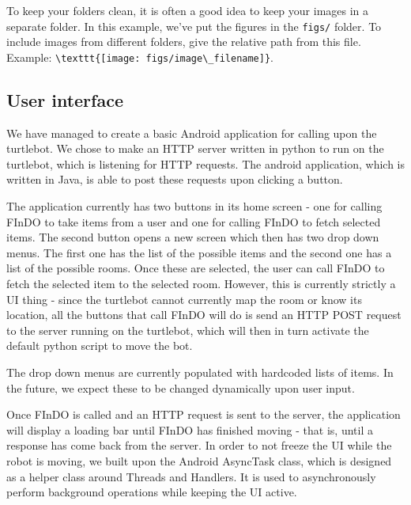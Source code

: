 \documentclass{article}
\begin{document}
To keep your folders clean, it is often a good idea to keep your images in a separate folder. In this example, we've put the figures in the \texttt{figs/} folder. To include images from different folders, give the relative path from this file. Example: \verb+\texttt{[image: figs/image\_filename]}+.


\subsection{User interface}

We have managed to create a basic Android application for calling upon the turtlebot. We chose to make an HTTP server written in python to run on the turtlebot, which is listening for HTTP requests. The android application, which is written in Java, is able to post these requests upon clicking a button.

The application currently has two buttons in its home screen - one for calling FInDO to take items from a user and one for calling FInDO to fetch selected items. The second button opens a new screen which then has two drop down menus. The first one has the list of the possible items and the second one has a list of the possible rooms. Once these are selected, the user can call FInDO to fetch the selected item to the selected room. However, this is currently strictly a UI thing - since the turtlebot cannot currently map the room or know its location, all the buttons that call FInDO will do is send an HTTP POST request to the server running on the turtlebot, which will then in turn activate the default python script to move the bot. 

The drop down menus are currently populated with hardcoded lists of items. In the future, we expect these to be changed dynamically upon user input.

Once FInDO is called and an HTTP request is sent to the server, the application will display a loading bar until FInDO has finished moving - that is, until a response has come back from the server. In order to not freeze the UI while the robot is moving, we built upon the Android AsyncTask class, which is designed as a helper class around Threads and Handlers. It is used to asynchronously perform background operations while keeping the UI active.
\end{document}
